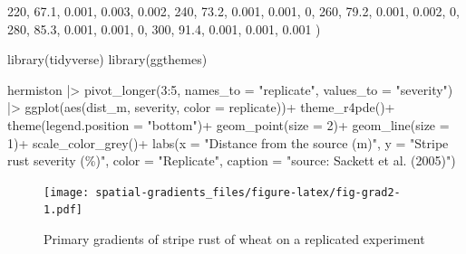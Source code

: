 \documentclass[
  letterpaper,
]{book}
\newenvironment{Shaded}{\begin{snugshade}}{\end{snugshade}}
\newcommand{\AttributeTok}[1]{\textcolor[rgb]{0.40,0.45,0.13}{#1}}
\newcommand{\DecValTok}[1]{\textcolor[rgb]{0.68,0.00,0.00}{#1}}
\newcommand{\FloatTok}[1]{\textcolor[rgb]{0.68,0.00,0.00}{#1}}
\newcommand{\FunctionTok}[1]{\textcolor[rgb]{0.28,0.35,0.67}{#1}}
\newcommand{\NormalTok}[1]{\textcolor[rgb]{0.00,0.23,0.31}{#1}}
\newcommand{\SpecialCharTok}[1]{\textcolor[rgb]{0.37,0.37,0.37}{#1}}
\newcommand{\StringTok}[1]{\textcolor[rgb]{0.13,0.47,0.30}{#1}}
\begin{document}
\begin{Shaded}
\begin{Highlighting}[]
  \DecValTok{220}\NormalTok{,   }\FloatTok{67.1}\NormalTok{, }\FloatTok{0.001}\NormalTok{, }\FloatTok{0.003}\NormalTok{, }\FloatTok{0.002}\NormalTok{,}
  \DecValTok{240}\NormalTok{,   }\FloatTok{73.2}\NormalTok{, }\FloatTok{0.001}\NormalTok{, }\FloatTok{0.001}\NormalTok{,     }\DecValTok{0}\NormalTok{,}
  \DecValTok{260}\NormalTok{,   }\FloatTok{79.2}\NormalTok{, }\FloatTok{0.001}\NormalTok{, }\FloatTok{0.002}\NormalTok{,     }\DecValTok{0}\NormalTok{,}
  \DecValTok{280}\NormalTok{,   }\FloatTok{85.3}\NormalTok{, }\FloatTok{0.001}\NormalTok{, }\FloatTok{0.001}\NormalTok{,     }\DecValTok{0}\NormalTok{,}
  \DecValTok{300}\NormalTok{,   }\FloatTok{91.4}\NormalTok{, }\FloatTok{0.001}\NormalTok{, }\FloatTok{0.001}\NormalTok{, }\FloatTok{0.001}
\NormalTok{  )}
\end{Highlighting}
\end{Shaded}

\begin{Shaded}
\begin{Highlighting}[]
\FunctionTok{library}\NormalTok{(tidyverse)}
\FunctionTok{library}\NormalTok{(ggthemes)}

\NormalTok{hermiston }\SpecialCharTok{|\textgreater{}} 
  \FunctionTok{pivot\_longer}\NormalTok{(}\DecValTok{3}\SpecialCharTok{:}\DecValTok{5}\NormalTok{, }\AttributeTok{names\_to =} \StringTok{"replicate"}\NormalTok{, }\AttributeTok{values\_to =} \StringTok{"severity"}\NormalTok{) }\SpecialCharTok{|\textgreater{}} 
  \FunctionTok{ggplot}\NormalTok{(}\FunctionTok{aes}\NormalTok{(dist\_m, severity, }\AttributeTok{color =}\NormalTok{ replicate))}\SpecialCharTok{+}
  \FunctionTok{theme\_r4pde}\NormalTok{()}\SpecialCharTok{+}
  \FunctionTok{theme}\NormalTok{(}\AttributeTok{legend.position =} \StringTok{"bottom"}\NormalTok{)}\SpecialCharTok{+}
  \FunctionTok{geom\_point}\NormalTok{(}\AttributeTok{size =} \DecValTok{2}\NormalTok{)}\SpecialCharTok{+}
  \FunctionTok{geom\_line}\NormalTok{(}\AttributeTok{size =} \DecValTok{1}\NormalTok{)}\SpecialCharTok{+}
  \FunctionTok{scale\_color\_grey}\NormalTok{()}\SpecialCharTok{+}
  \FunctionTok{labs}\NormalTok{(}\AttributeTok{x =} \StringTok{"Distance from the source (m)"}\NormalTok{,}
       \AttributeTok{y =} \StringTok{"Stripe rust severity (\%)"}\NormalTok{,}
       \AttributeTok{color =} \StringTok{"Replicate"}\NormalTok{,}
       \AttributeTok{caption =} \StringTok{"source: Sackett et al. (2005)"}\NormalTok{)}
\end{Highlighting}
\end{Shaded}

\begin{figure}

{\centering \texttt{[image: spatial-gradients\_files/figure-latex/fig-grad2-1.pdf]}

}

\caption{\label{fig-grad2}Primary gradients of stripe rust of wheat on a
replicated experiment}

\end{figure}
\end{document}
